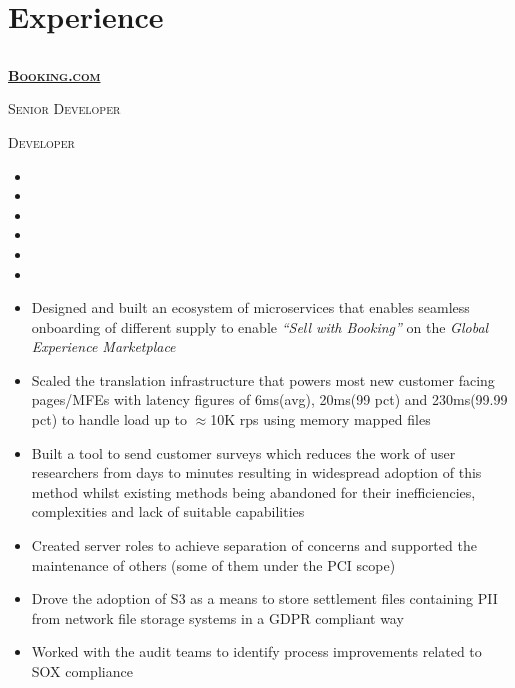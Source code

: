 \documentclass{article}
\begin{document}
\section{Experience}
\subsection[Booking.com]{}
{\raggedright{\textsc{\textbf{\href{https://www.booking.com/}{Booking.com}}}}} \hfill {}

{\raggedright{\textsc{Senior Developer}}} \hfill {}

{\raggedright{\textsc{Developer}}} \hfill {}

\begin{itemize}[noitemsep,nolistsep]
\item <todo: fill in stuff about foundations>
\item <todo: fill in stuff about relevance>
\item <todo: fill in stuff about data>
\item <todo: fill in stuff about distribution>
\item <todo: fill in stuff about transactions>
\item <todo: fill in stuff about promos>
\item Designed and built an ecosystem of microservices that enables seamless onboarding of different supply to enable \textit{“Sell with Booking”} on the \textit{Global Experience Marketplace}
\item Scaled the translation infrastructure that powers most new customer facing pages/MFEs with latency figures of 6ms(avg), 20ms(99 pct) and 230ms(99.99 pct) to handle load up to $\approx$10K rps using memory mapped files
\item Built a tool to send customer surveys which reduces the work of user researchers from days to minutes resulting in widespread adoption of this method whilst existing methods being abandoned for their inefficiencies, complexities and lack of suitable capabilities
\item Created server roles to achieve separation of concerns and supported the maintenance of others (some of them under the PCI scope)
\item Drove the adoption of S3 as a means to store settlement files containing PII from network file storage systems in a GDPR compliant way
\item Worked with the audit teams to identify process improvements related to SOX compliance

\end{itemize}
\end{document}
